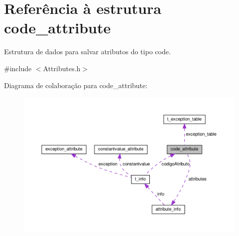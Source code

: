 \hypertarget{structcode__attribute}{}\section{Referência à estrutura code\+\_\+attribute}
\label{structcode__attribute}


Estrutura de dados para salvar atributos do tipo code.  




{\ttfamily \#include $<$Attributes.\+h$>$}



Diagrama de colaboração para code\+\_\+attribute\+:
\nopagebreak
\begin{figure}[H]
\begin{center}
\leavevmode
\includegraphics[width=350pt]{structcode__attribute__coll__graph}
\end{center}
\end{figure}
